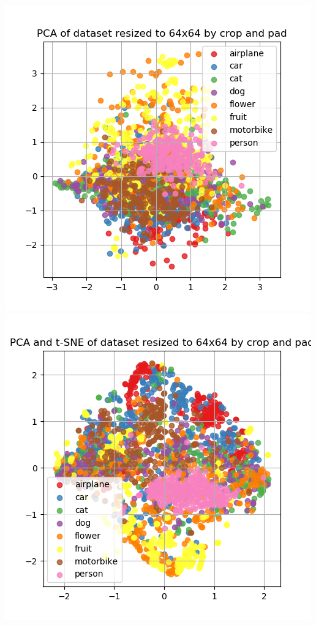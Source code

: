 \documentclass{article}
\begin{document}
\begin{minipage}[c]{\linewidth}
	\includegraphics[width= \figureWidth\textwidth]{./figures/pca_h64_w64_cp_none.png}
	\includegraphics[width= \figureWidth\textwidth]{./figures/pca_tsne_h64_w64_cp_none.png}

\end{minipage}
\end{document}

